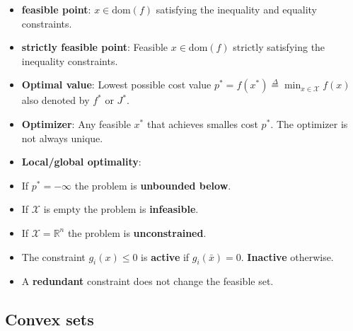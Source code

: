 \documentclass[8pt,a4paper]{scrartcl}
\begin{document}
\begin{multicols*}{3}
\begin{multicols*}{4}
{\begin{itemize}
\item \textbf{feasible point}: $x\in\text{dom}(f)$ satisfying the inequality and equality constraints.
\item \textbf{strictly feasible point}: Feasible $x\in\text{dom}(f)$ strictly satisfying the inequality constraints.
\item \textbf{Optimal value}: Lowest possible cost value $p^\ast=f(x^\ast)\overset{\Delta}{=}\min_{x\in\mathcal{X}}f(x)$ also denoted by $f^\ast$ or $J^\ast$.
\item \textbf{Optimizer}: Any feasible $x^\ast$ that achieves smalles cost $p^\ast$. The optimizer is not always unique.
\item \textbf{Local/global optimality}: 

\item If $p^\ast=-\infty$ the problem is \textbf{unbounded below}.
\item If $\mathcal{X}$ is empty the problem is \textbf{infeasible}.
\item If $\mathcal{X}=\mathbb{R}^n$ the problem is \textbf{unconstrained}.
\item The constraint $g_i(x)\leq 0$ is \textbf{active} if $g_i(\bar{x})=0$. \textbf{Inactive} otherwise.
\item A \textbf{redundant} constraint does not change the feasible set.
\end{itemize}
}%

%
%
%
%
%

\subsection{Convex sets}


\end{multicols*}
\end{multicols*}
\end{document}
